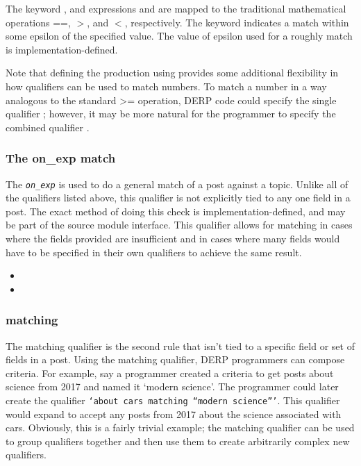 The keyword , and expressions  and  are mapped to the traditional mathematical operations ==, $>$, and $<$, respectively.
The keyword  indicates a match within some epsilon of the specified value. The value of epsilon used for a roughly match is implementation-defined.

Note that defining the  production using  provides some additional flexibility in how qualifiers can be used to match numbers. To match a
number in a way analogous to the standard >= operation, DERP code could specify the single qualifier ; however, it may be more natural
for the programmer to specify the combined qualifier .

\subsubsection{The on\_exp match}\label{onexp}
The \texttt{\textit{on\_exp}} is used to do a general match of a post against a topic. Unlike all of the qualifiers listed above, this qualifier is not explicitly
tied to any one field in a post. The exact method of doing this check is implementation-defined, and may be part of the source module interface. This qualifier
allows for matching in cases where the fields provided are insufficient and in cases where many fields would have to be specified in their own qualifiers to achieve
the same result.

\begin{itemize}[leftmargin=2in]
    \item[\nonterminal{qualifier}] \bnf{:} 
    \item[\nonterminal{on\_exp}] \bnf{:}  \bnf{(} \bnf{|} \bnf{)}
\end{itemize}

\subsubsection{matching}
The matching qualifier is the second rule that isn’t tied to a specific field or set of fields in a post. Using the matching qualifier, DERP programmers can compose criteria.
For example, say a programmer created a criteria to get posts about science from 2017 and named it ‘modern science’. The programmer could later create the qualifier \texttt{‘about cars matching “modern science”’}.
This qualifier would expand to accept any posts from 2017 about the science associated with cars. Obviously, this is a fairly trivial example; the matching qualifier can be
used to group qualifiers together and then use them to create arbitrarily complex new qualifiers.

